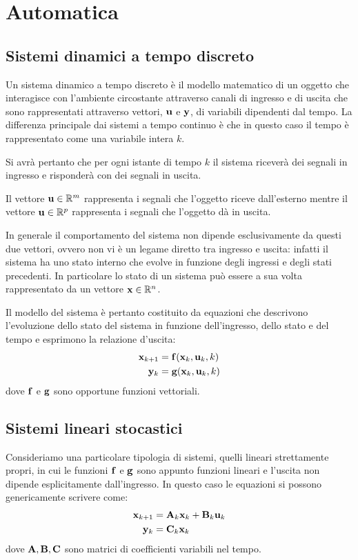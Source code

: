 \section{Automatica}
\subsection{Sistemi dinamici a tempo discreto}

Un sistema dinamico a tempo discreto è il modello matematico di un oggetto che interagisce con l’ambiente circostante attraverso canali di ingresso e di uscita che sono rappresentati attraverso vettori, $\mathbf{u}$ e $\mathbf{y}$, di variabili dipendenti dal tempo. La differenza principale dai sistemi a tempo continuo è che in questo caso il tempo è rappresentato come una variabile intera $k$.

Si avrà pertanto che per ogni istante di tempo $k$ il sistema riceverà dei segnali in ingresso e risponderà con dei segnali in uscita.

Il vettore $\mathbf{u} \in \mathbb{R}^m$ rappresenta i segnali che l’oggetto riceve dall’esterno mentre il vettore $\mathbf{u} \in \mathbb{R}^p$ rappresenta i segnali che l’oggetto dà in uscita.

In generale il comportamento del sistema non dipende esclusivamente da questi due vettori, ovvero non vi è un legame diretto tra ingresso e uscita: infatti il sistema ha uno stato interno che evolve in funzione degli ingressi e degli stati precedenti. In particolare lo stato di un sistema può essere a sua volta rappresentato da un vettore $\mathbf{x} \in \mathbb{R}^n$.

Il modello del sistema è pertanto costituito da equazioni che descrivono l’evoluzione dello stato del sistema in funzione dell’ingresso, dello stato e del tempo e esprimono la relazione d'uscita:
\begin{align*}
\mathbf{x}_{k+1} &= \mathbf{f}(\mathbf{x}_k,\mathbf{u}_k,k) \\
\mathbf{y}_k &= \mathbf{g}(\mathbf{x}_k,\mathbf{u}_k,k)
\end{align*}
dove $\mathbf{f}$ e $\mathbf{g}$ sono opportune funzioni vettoriali.

\subsection{Sistemi lineari stocastici}
Consideriamo una particolare tipologia di sistemi, quelli lineari strettamente propri, in cui le funzioni $\mathbf{f}$ e $\mathbf{g}$ sono appunto funzioni lineari e l’uscita non dipende esplicitamente dall’ingresso. In questo caso le equazioni si possono genericamente scrivere come:
\begin{align*}
\mathbf{x}_{k+1} &= \mathbf{A}_k\mathbf{x}_k + \mathbf{B}_k\mathbf{u}_k \\
\mathbf{y}_k &= \mathbf{C}_k\mathbf{x}_k
\end{align*}
dove $\mathbf{A},\mathbf{B},\mathbf{C}$ sono matrici di coefficienti variabili nel tempo.

